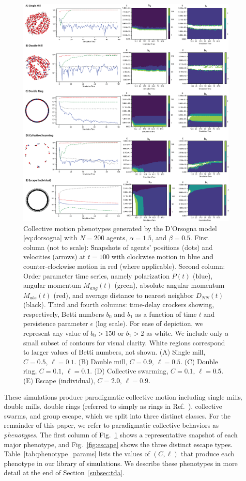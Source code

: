 \documentclass[%
 aip,
reprint,
 amsmath,amssymb,
 aps,
showkeys
]{revtex4-1}
\begin{document}
\begin{figure}
    \centering
    \includegraphics[width=.9\textwidth]{Manu_Fig1_Updated.png}
    \caption{\label{fig:phenotypes} Collective motion phenotypes  generated by the D'Orsogna model \eqref{eq:dorsogna} with $N=200$ agents, $\alpha=1.5$, and $\beta=0.5$. First column (not to scale): Snapshots of agents' positions (dots) and velocities (arrows) at $t=100$ with clockwise motion in blue and counter-clockwise motion in red (where applicable). Second column: Order parameter time series, namely  polarization $P(t)$ (blue), angular momentum $M_{ang}(t)$ (green), absolute angular momentum $M_{abs}(t)$ (red), and average distance to nearest neighbor $D_{NN}(t)$ (black). Third and fourth columns: time-delay crockers showing, respectively, Betti numbers $b_0$ and $b_1$ as a function of time $t$ and persistence parameter $\epsilon$ (log scale). For ease of depiction, we represent any value of $b_0>150$ or $b_1>2$ as white. We include only a small subset of contours for visual clarity. White regions correspond to larger values of Betti numbers, not shown. (A) Single mill, $C=0.5$, $\ell=0.1$. (B) Double mill, $C=0.9$, $\ell=0.5$. (C) Double ring, $C=0.1$, $\ell=0.1$. (D) Collective swarming, $C=0.1$, $\ell=0.5$. (E) Escape (individual), $C=2.0$, $\ell=0.9$.}
\end{figure}

These simulations produce paradigmatic collective motion including single mills, double mills, double rings (referred to simply as rings in Ref.~), collective swarms, and group escape, which we split into three distinct classes. \cite{DorChuBer2006} For the remainder of this paper, we refer to paradigmatic collective behaviors as \emph{phenotypes}. The first column of Fig.~\ref{fig:phenotypes} shows a representative snapshot of each major phenotype, and Fig.~\ref{fig:escape} shows the three distinct escape types. Table~\ref{tab:phenotype_params} lists the values of $(C,\ell)$ that produce each phenotype in our library of simulations. We describe these phenotypes in more detail at the end of Section~\ref{subsec:tda}.
\end{document}
